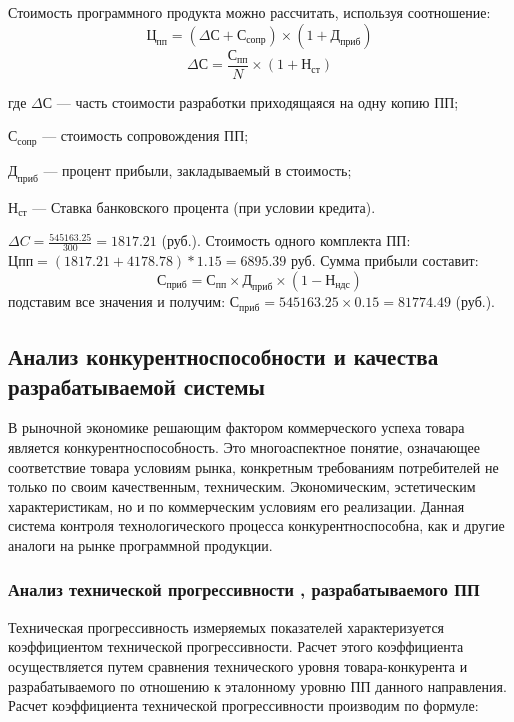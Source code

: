 Стоимость программного продукта можно рассчитать, используя соотношение:
\begin{equation}Ц_{пп} = (\Delta{}С + С_{сопр}) \times{} (1 + Д_{приб})\end{equation}
\begin{equation}\Delta{}С = \frac{С_{пп}}{N} \times{} (1 + Н_{ст})\end{equation}

\begin{ESKDexplanation}                       
	\item[где ] $\Delta{}С$ --- часть стоимости разработки приходящаяся на одну копию ПП;
	\item{} $С_{сопр}$ --- стоимость сопровождения ПП;
	\item{} $Д_{приб}$ --- процент прибыли, закладываемый в стоимость;
	\item{} $Н_{ст}$ --- Ставка банковского процента (при условии кредита).
\end{ESKDexplanation}

$\Delta{} C = \frac{545163.25}{300} = 1817.21$ (руб.).
Стоимость одного комплекта ПП: $Цпп = (1817.21 +4178.78)*1.15  =  6895.39$ руб.
Сумма прибыли составит:
\begin{equation}С_{приб} = С_{пп} \times{} Д_{приб} \times{} (1 - Н_{ндс})\end{equation}
подставим все значения и получим: $С_{приб} = 545163.25 \times{} 0.15 =  81774.49$ (руб.).


\subsection{Анализ конкурентноспособности и качества   разрабатываемой системы}
В рыночной экономике решающим фактором коммерческого успеха товара является конкурентноспособность.
Это многоаспектное понятие, означающее соответствие товара условиям рынка, конкретным
требованиям потребителей не только по своим качественным, техническим.
Экономическим, эстетическим характеристикам, но и по коммерческим условиям его реализации.
Данная система контроля технологического процесса конкурентноспособна, как и другие аналоги
на рынке программной продукции.

\subsubsection{Анализ технической  прогрессивности , разрабатываемого ПП}
Техническая прогрессивность  измеряемых показателей  характеризуется
коэффициентом технической прогрессивности. Расчет этого коэффициента 
осуществляется путем сравнения  технического уровня  товара-конкурента
и разрабатываемого по отношению к эталонному уровню  ПП  данного направления.
Расчет коэффициента технической прогрессивности производим по формуле:

